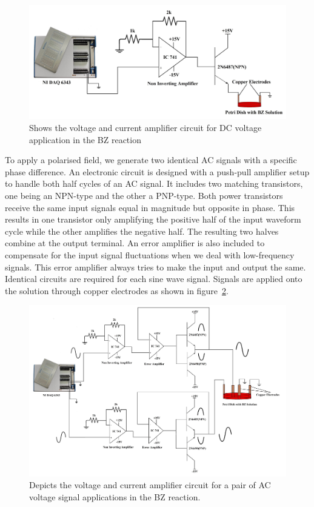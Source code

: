 \documentclass[journal=jacsat,manuscript=article]{achemso}
\begin{document}
\begin{figure}[H]
	\centering
	\includegraphics[width=\linewidth]{pulse circuit - Copy.jpg}
	\caption{Shows the voltage and current amplifier circuit for DC
		voltage application in the BZ reaction}
	\label{fig:ex2}
\end{figure}

To apply a polarised field, we generate two identical AC signals with
a specific phase difference. An electronic circuit is designed with a
push-pull amplifier setup to handle both half cycles of an AC signal.
It includes two matching transistors, one being an NPN-type and the
other a PNP-type. Both power transistors receive the same input
signals equal in magnitude but opposite in phase. This results in one
transistor only amplifying the positive half of the input waveform
cycle while the other amplifies the negative half. The resulting two
halves combine at the output terminal. An error amplifier is also
included to compensate for the input signal fluctuations when we deal
with low-frequency signals. This error amplifier always tries to make
the input and output the same. Identical circuits are required for
each sine wave signal. Signals are applied onto the solution through
copper electrodes as shown in figure~\ref{fig:ex6}.
\begin{figure}[H]
	\centering
	\includegraphics[width=\linewidth]{CPEF - Copy.jpg}
	\caption{Depicts the voltage and current amplifier circuit for a
		pair of AC voltage signal applications in the BZ reaction.}
	\label{fig:ex6}
\end{figure}
\end{document}
